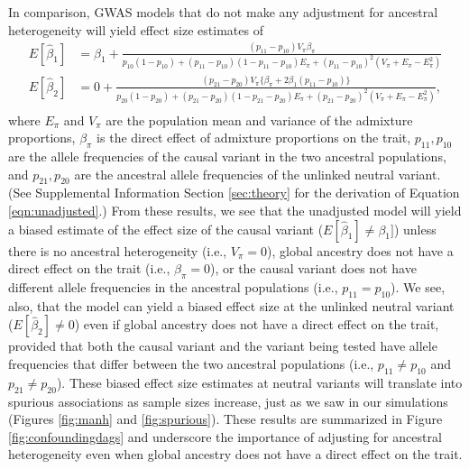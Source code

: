 \documentclass[12pt]{article}
\begin{document}
In comparison, GWAS models that do not make any adjustment for ancestral heterogeneity will yield effect size estimates of
\begin{equation}
\begin{aligned}
E[\hat\beta_1] & = \beta_1 + \frac{(p_{11}- p_{10})V_\pi \beta_\pi }{p_{10}(1-p_{10}) + (p_{11}-p_{10})(1-p_{11}-p_{10})E_\pi + (p_{11}-p_{10})^2(V_\pi + E_\pi - E_\pi^2)} \\
E[\hat\beta_2] & = 0 + \frac{(p_{21}-p_{20}) V_\pi\{\beta_\pi + 2\beta_1(p_{11}- p_{10})\}}{p_{20}(1-p_{20}) + (p_{21}-p_{20})(1-p_{21}-p_{20})E_\pi + (p_{21}-p_{20})^2(V_\pi + E_\pi - E_\pi^2)},\\
\end{aligned}
\label{eqn:unadjusted}
\end{equation}
where $E_\pi$ and $V_\pi$ are the population mean and variance of the admixture proportions, $\beta_\pi$ is the direct effect of admixture proportions on the trait, $p_{11}, p_{10}$ are the allele frequencies of the causal variant in the two ancestral populations, and $p_{21}, p_{20}$ are the ancestral allele frequencies of the unlinked neutral variant.
(See Supplemental Information Section \ref{sec:theory} for the derivation of Equation \ref{eqn:unadjusted}.)
From these results, we see that the unadjusted model will yield a biased estimate of the effect size of the causal variant ($E[\hat\beta_1] \neq \beta_1]$) unless there is no ancestral heterogeneity (i.e., $V_\pi = 0$), global ancestry does not have a direct effect on the trait (i.e., $\beta_\pi = 0$), or the causal variant does not have different allele frequencies in the ancestral populations (i.e., $p_{11} = p_{10}$). 
We see, also, that the model can yield a biased effect size at the unlinked neutral variant ($E[\hat\beta_2] \neq 0$) even if global ancestry does not have a direct effect on the trait, provided that both the causal variant and the variant being tested have allele frequencies that differ between the two ancestral populations (i.e., $p_{11} \neq p_{10}$ and $p_{21} \neq p_{20}$).
These biased effect size estimates at neutral variants will translate into spurious associations as sample sizes increase, just as we saw in our simulations (Figures \ref{fig:manh} and \ref{fig:spurious}).
These results are summarized in Figure \ref{fig:confoundingdags} and underscore the importance of adjusting for ancestral heterogeneity even when global ancestry does not have a direct effect on the trait.
\end{document}
